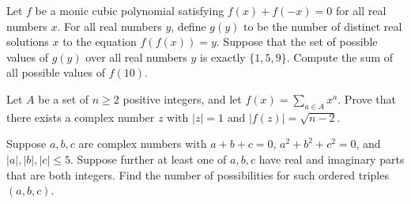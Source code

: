 \documentclass[11pt]{article}
\theoremstyle{definition}
\begin{document}
%	



\begin{question}[name={2021 HMMT, Algebra \& Number Theory, \href{https://artofproblemsolving.com/community/c4p22157502}{Problem 9}}]
	Let $f$ be a monic cubic polynomial satisfying $f(x) + f(-x) = 0$ for all real numbers $x$. For all real numbers $y$, define $g(y)$ to be the number of distinct real solutions $x$ to the equation $f(f(x)) = y$. Suppose that the set of possible values of $g(y)$ over all real numbers $y$ is exactly $\{1, 5, 9\}$. Compute the sum of all possible values of $f(10)$.
\end{question}


%	



\begin{question}[name={2021 HMIC, \href{https://artofproblemsolving.com/community/c4p21784600}{Problem 3}}]
	Let $A$ be a set of $n\ge2$ positive integers, and let $\textstyle f(x)=\sum_{a\in A}x^a$. Prove that there exists a complex number $z$ with $\lvert z\rvert=1$ and $\lvert f(z)\rvert=\sqrt{n-2}$.
\end{question}



%	







\begin{question}[name={2021-22 CHMMC Winter, Team Round, \href{https://artofproblemsolving.com/community/c126h2825790p24985973}{Problem 3}}]
	Suppose $a, b, c$ are complex numbers with $a + b + c = 0$, $a^2 + b^2 + c^2 = 0$, and $|a|,|b|,|c| \le 5$. Suppose further at least one of $a, b, c$ have real and imaginary parts that are both integers. Find the number of possibilities for such ordered triples $(a, b, c)$.	
\end{question}




%	
\end{document}

